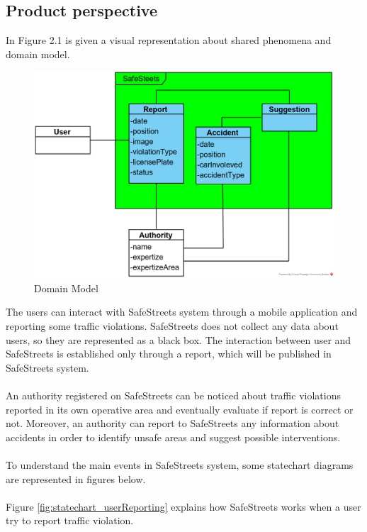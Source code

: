 \documentclass{article}
\begin{document}
		\subsection{Product perspective}
			In Figure 2.1 is given a visual representation about shared phenomena and domain model. 
			\begin{figure}[ht]
				\centering
				\includegraphics {diagrams/domain_model.png}
				\caption[Domain Model]{Domain Model}
				\label{fig:domain_model}
			\end{figure}
			
			The users can interact with SafeStreets system through a mobile application and reporting some traffic violations.
			SafeStreets does not collect any data about users, so they are represented as a black box. The interaction between user and SafeStreets is established only through 
			a report, which will be published in SafeStreets system.\\\\
			An authority registered on SafeStreets can be noticed about traffic violations reported in its own operative area and eventually evaluate if report is correct or not. Moreover, an authority can report to SafeStreets any information about accidents in order to identify unsafe areas and suggest possible interventions.\\\\
			To understand the main events in SafeStreets system, some statechart diagrams are represented in figures below. \\\\
			\clearpage
			Figure \ref{fig:statechart_userReporting} explains how SafeStreets works when a user try to report traffic violation.
			
\end{document}
